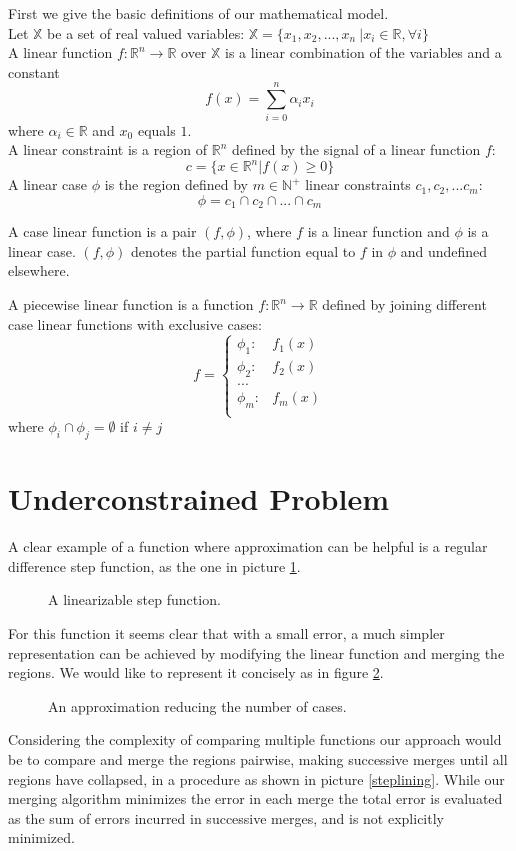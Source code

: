First we give the basic definitions of our mathematical model.\\
Let  $\mathbb{X}$ be a set of real valued variables: $\mathbb{X} = \{ x_1, x_2, ... , x_n\ | x_i \in \mathbb{R}, \forall i\}$\\
A linear function $f: \mathbb{R}^n \rightarrow \mathbb{R}$ over $\mathbb{X}$ is a linear combination of the variables and a constant 
$$f(x) = \sum_{i=0}^n { \alpha_i x_i}$$ where $\alpha_i \in \mathbb{R}$ and $x_0$ equals $1$.\\
A linear constraint is a region of $\mathbb{R}^n$ defined by the signal of a linear function $f$:
$$c = \{	x \in \mathbb{R}^n | f(x) \geq 0 \} $$
A linear case $\phi$ is the region defined by $m \in \mathbb{N}^+$ linear constraints $c_1, c_2, ... c_m$:
$$ \phi =c_1 \cap c_2 \cap ... \cap c_m $$

A case linear function is a pair $(f, \phi)$, where $f$ is a linear function and $\phi$ is a linear case.  $(f, \phi)$ denotes the partial function equal to $f$ in $\phi$ and undefined elsewhere.

A piecewise linear function is a function $f: \mathbb{R}^n \rightarrow \mathbb{R}$ defined by joining different case linear functions with exclusive cases:
$$ f = 
\left\{
	\begin{array}{ll}
		\phi_1 : & f_1(x)\\
		\phi_2 : & f_2(x)\\
		... & \\
		\phi_m : & f_m(x)\\
	\end{array}
\right.
$$
where $\phi_i \cap \phi_j = \emptyset$ if $i \neq j$

\section{Underconstrained Problem} 
\label{appB} 

A clear example of a function where approximation can be helpful is a regular difference step function, as the one in picture \ref{stepf}. 
\begin{figure}[!h]
\center
{}%
\caption{A linearizable step function.}
\label{stepf} 
\end{figure}

For this function it seems clear that with a small error, a much simpler representation can be achieved by modifying the linear function and merging the regions. We would like to represent it concisely as in figure \ref{steplin}.
\begin{figure}[h]
\center
{}%
\caption{An approximation reducing the number of cases.}
\label{steplin} 
\end{figure}
Considering the complexity of comparing multiple functions our approach would be to compare and merge the regions pairwise, making successive merges until all regions have collapsed, in a procedure as shown in picture \ref{steplining}. While our merging algorithm minimizes the error in each merge the total error is evaluated as the sum of errors incurred in successive merges, and is not explicitly minimized.

